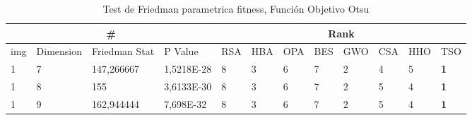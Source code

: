 \documentclass[conference]{IEEEtran}
\begin{document}
\begin{table*}[]
	\centering
	\caption{Test de Friedman parametrica fitness, Función Objetivo Otsu}
	\begin{tabular}{|llll|llllllll|}
		\hline
		\multicolumn{4}{|c|}{\#} & \multicolumn{8}{c|}{Rank} \\ \hline
		\multicolumn{1}{|l|}{img} & \multicolumn{1}{l|}{Dimension} & \multicolumn{1}{l|}{Friedman Stat} & P Value & \multicolumn{1}{l|}{RSA} & \multicolumn{1}{l|}{HBA} & \multicolumn{1}{l|}{OPA} & \multicolumn{1}{l|}{BES} & \multicolumn{1}{l|}{GWO} & \multicolumn{1}{l|}{CSA} & \multicolumn{1}{l|}{HHO} & TSO \\ \hline 
\multicolumn{1}{|l|}{1}                                                     & \multicolumn{1}{l|}{7}                                                        & \multicolumn{1}{l|}{147,266667}                                                   & 1,5218E-28                     & \multicolumn{1}{l|}{8}                                                  & \multicolumn{1}{l|}{3}                                                  & \multicolumn{1}{l|}{6}                                                  & \multicolumn{1}{l|}{7}                                                  & \multicolumn{1}{l|}{2}                                                  & \multicolumn{1}{l|}{4}                                                  & \multicolumn{1}{l|}{5}                                                  & \textbf{1}                 \\ \hline
\multicolumn{1}{|l|}{1}                                                     & \multicolumn{1}{l|}{8}                                                        & \multicolumn{1}{l|}{155}                                                          & 3,6133E-30                     & \multicolumn{1}{l|}{8}                                                  & \multicolumn{1}{l|}{3}                                                  & \multicolumn{1}{l|}{6}                                                  & \multicolumn{1}{l|}{7}                                                  & \multicolumn{1}{l|}{2}                                                  & \multicolumn{1}{l|}{5}                                                  & \multicolumn{1}{l|}{4}                                                  & \textbf{1}                 \\ \hline
\multicolumn{1}{|l|}{1}                                                     & \multicolumn{1}{l|}{9}                                                        & \multicolumn{1}{l|}{162,944444}                                                   & 7,698E-32                      & \multicolumn{1}{l|}{8}                                                  & \multicolumn{1}{l|}{3}                                                  & \multicolumn{1}{l|}{6}                                                  & \multicolumn{1}{l|}{7}                                                  & \multicolumn{1}{l|}{2}                                                  & \multicolumn{1}{l|}{5}                                                  & \multicolumn{1}{l|}{4}                                                  & \textbf{1}                 \\ \hline

\end{tabular}
\end{table*}
\end{document}
